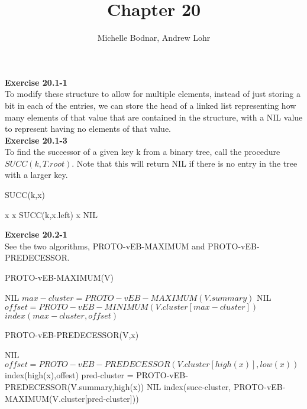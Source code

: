 \documentclass{article}
\title{Chapter 20}
\author{Michelle Bodnar, Andrew Lohr}
\begin{document}
\maketitle


\noindent\textbf{Exercise 20.1-1}\\
To modify these structure to allow for multiple elements, instead of just storing a bit in each of the entries, we can store the head of a linked list representing how many elements of that value that are contained in the structure, with a NIL value to represent having no elements of that value.\\

\noindent\textbf{Exercise 20.1-3}\\
To find the successor of a given key k from a binary tree, call the procedure $SUCC(k, T.root)$. Note that this will return NIL if there is no entry in the tree with a larger key.\\
\begin{algorithm}
\caption{ SUCC(k,x)}
\begin{algorithmic}
		\State \Return x
	\Else
			\State \Return x
		\Else 
			\State \Return SUCC(k,x.left)
		\EndIf
	\EndIf
\Else
		\State \Return x
	\Else
		\State \Return NIL
	\EndIf
\EndIf
\end{algorithmic}
\end{algorithm}

\noindent\textbf{Exercise 20.2-1}\\
See the two algorithms, PROTO-vEB-MAXIMUM and PROTO-vEB-PREDECESSOR.
\begin{algorithm}
\caption{PROTO-vEB-MAXIMUM(V)}
\begin{algorithmic}
\State {}
\State {}
\Else
\State \Return NIL
\EndIf
\Else
\State $max-cluster = PROTO-vEB-MAXIMUM(V.summary)$
\State \Return NIL
\Else
\State $offset =  PROTO-vEB-MINIMUM(V.cluster[max-cluster])$
\State \Return $index(max-cluster,offset)$
\EndIf
\EndIf
\end{algorithmic}
\end{algorithm}

\begin{algorithm}
\caption{PROTO-vEB-PREDECESSOR(V,x)}
\begin{algorithmic}
\State {}
\Else
\State \Return NIL
\EndIf
\Else
\State $offset = PROTO-vEB-PREDECESSOR(V.cluster[high(x)],low(x))$
\State \Return index(high(x),offest)
\Else
\State pred-cluster = PROTO-vEB-PREDECESSOR(V.summary,high(x))
\State \Return NIL
\Else
\State \Return index(succ-cluster, PROTO-vEB-MAXIMUM(V.cluster[pred-cluster]))
\EndIf
\EndIf
\EndIf
\end{algorithmic}
\end{algorithm}
\end{document}
